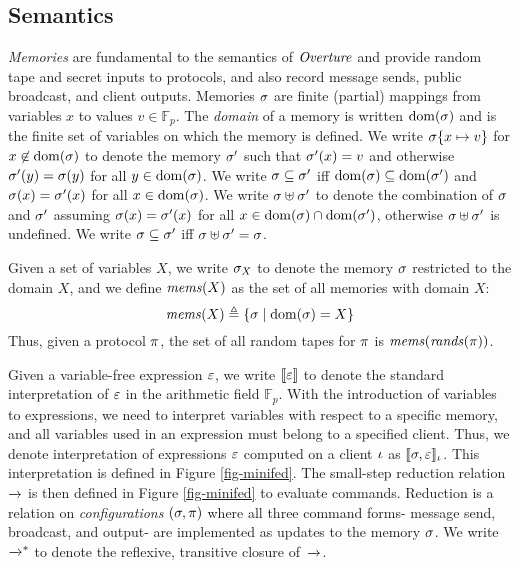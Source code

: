 \subsection{Semantics}
\label{section-lang-semantics}

\emph{Memories} are fundamental to the semantics of $\mathit{Overture}$ and
provide random tape and secret inputs to protocols, and also record
message sends, public broadcast, and client outputs. Memories $\sigma$
are finite (partial) mappings from variables $x$ to values $v \in
\mathbb{F}_p$.  The \emph{domain} of a memory is written
$\mathrm{dom}(\sigma)$ and is the finite set of variables on which the memory
is defined.  We write $\sigma\{ x \mapsto v\}$ for
$x\not\in\mathrm{dom}(\sigma)$ to denote the memory $\sigma'$ such that
$\sigma'(x) = v$ and otherwise $\sigma'(y) = \sigma(y)$ for all $y \in
\mathrm{dom}(\sigma)$. We write $\sigma \subseteq \sigma'$ iff $\mathrm{dom}(\sigma)
\subseteq \mathrm{dom}(\sigma')$ and $\sigma(x) = \sigma'(x)$ for all $x \in
\mathrm{dom}(\sigma)$. We write $\sigma \uplus \sigma'$ to denote the
combination of $\sigma$ and $\sigma'$ assuming $\sigma(x) =
\sigma'(x)$ for all $x \in \mathrm{dom}(\sigma) \cap \mathrm{dom}(\sigma')$, otherwise
$\sigma \uplus \sigma'$ is undefined.    We write
$\sigma \subseteq \sigma'$ iff $\sigma \uplus \sigma' = \sigma$.

Given a set of variables $X$, we write $\sigma_X$ to denote the
memory $\sigma$ restricted to the domain $X$, and we define
$\mathit{mems}(X)$ as the set of all memories with domain $X$:
$$
\mathit{mems}(X) \triangleq \{ \sigma \mid \mathrm{dom}(\sigma) = X \}
$$
Thus, given a protocol $\pi$, the set of all random tapes for
$\pi$ is $\mathit{mems}(\mathit{rands}(\pi))$.

Given a variable-free expression $\varepsilon$, we write $\llbracket \varepsilon \rrbracket$ to denote
the standard interpretation of $\varepsilon$ in the arithmetic field
$\mathbb{F}_{p}$. With the introduction of variables to expressions,
we need to interpret variables with respect to a specific memory, and
all variables used in an expression must belong to a specified client.
Thus, we denote interpretation of expressions $\varepsilon$ computed on a
client $\iota$ as $\llbracket \sigma,\varepsilon \rrbracket_{\iota}$. This interpretation is
defined in Figure \ref{fig-minifed}. The small-step reduction relation
$\xrightarrow{}$ is then defined in Figure \ref{fig-minifed} to evaluate
commands. Reduction is a relation on \emph{configurations} $(\sigma,
\pi)$ where all three command forms- message send, broadcast, and
output- are implemented as updates to the memory $\sigma$. We write
$\xrightarrow{}^{*}$ to denote the reflexive, transitive closure of\ $\xrightarrow{}$.


